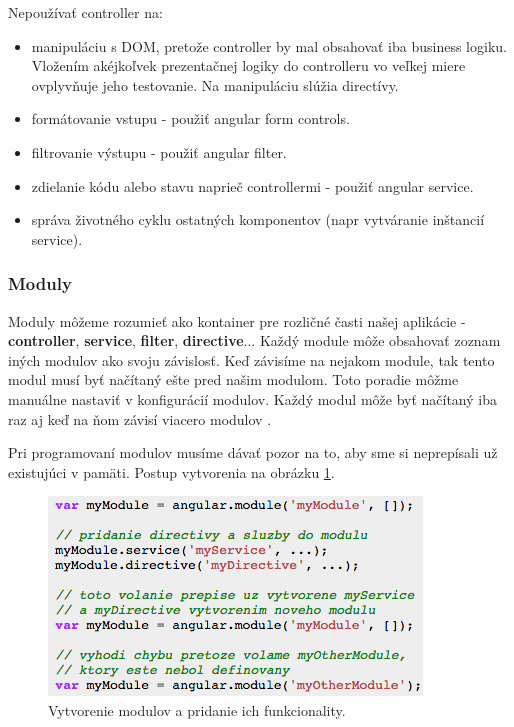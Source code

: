 \noindent Nepoužívať controller na:
\begin{itemize}
\item manipuláciu s DOM, pretože controller by mal obsahovať iba business logiku. Vložením akéjkoľvek prezentačnej logiky do controlleru vo veľkej miere ovplyvňuje jeho testovanie. Na manipuláciu slúžia directívy.
\item formátovanie vstupu - použiť angular form controls.
\item filtrovanie výstupu - použiť angular filter.
\item zdielanie kódu alebo stavu naprieč controllermi - použiť angular service.
\item správa životného cyklu ostatných komponentov (napr vytváranie inštancií service).
\end{itemize}


\subsubsection{Moduly}
Moduly môžeme rozumieť ako kontainer pre rozličné časti našej aplikácie - \textbf{controller}, \textbf{service}, \textbf{filter}, \textbf{directive}... Každý module môže obsahovať zoznam iných modulov ako svoju závislosť. Keď závisíme na nejakom module, tak tento modul musí byť načítaný ešte pred našim modulom. Toto poradie môžme manuálne nastaviť v konfigurácií modulov. Každý modul môže byť načítaný iba raz aj keď na ňom závisí viacero modulov \cite{angular-docs}.

Pri programovaní modulov musíme dávať pozor na to, aby sme si neprepísali už existujúci v pamäti. Postup vytvorenia na obrázku \ref{img-angular-module-def}.

\begin{figure}[H]
  \centering
  \includegraphics[scale=0.8]{img/code/angular-module.png}
  \caption{Vytvorenie modulov a pridanie ich funkcionality.}
  \label{img-angular-module-def}
\end{figure}

